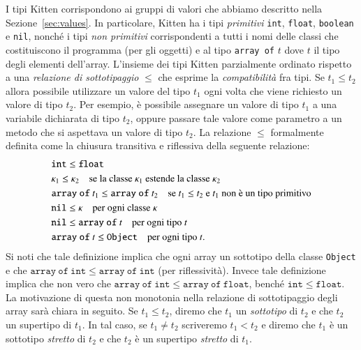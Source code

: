 I tipi Kitten corrispondono ai gruppi di valori che abbiamo descritto
nella Sezione~\ref{sec:values}. In particolare, Kitten ha i tipi
\emph{primitivi} \texttt{int}, \texttt{float}, \texttt{boolean} e
\texttt{nil}, nonch\'e i tipi \emph{non primitivi} corrispondenti
a tutti i nomi delle classi che costituiscono il
programma (per gli oggetti) e al tipo
\texttt{array of} $t$ dove $t$ \e il tipo degli elementi dell'array.
L'insieme dei tipi Kitten \e parzialmente ordinato rispetto a una
\emph{relazione di sottotipaggio} $\le$ che esprime la \emph{compatibilit\`a}
fra tipi. Se $t_1\le t_2$ allora \e possibile utilizzare un valore del
tipo $t_1$ ogni volta che viene richiesto un valore di tipo $t_2$.
Per esempio, \`e possibile assegnare un valore di tipo $t_1$ a una
variabile dichiarata di tipo $t_2$, oppure passare tale valore come parametro
a un metodo che si aspettava un valore di tipo $t_2$.
La relazione $\le$ \e formalmente definita come
la chiusura transitiva e riflessiva della seguente relazione:
%
\begin{eqnarray*}
  &\mathtt{int}\le\mathtt{float}\\
  &\kappa_1\le\kappa_2\quad\text{se la classe $\kappa_1$ estende la classe $\kappa_2$}\\
  &\mathtt{array\ of\ }t_1\le\mathtt{array\ of\ }t_2\quad
    \text{se $t_1\le t_2$ e $t_1$ non \`e un tipo primitivo}\\
  &\mathtt{nil}\le\kappa\quad\text{per ogni classe $\kappa$}\\
  &\mathtt{nil}\le\mathtt{array\ of\ }t\quad\text{per ogni tipo $t$}\\
  &\mathtt{array\ of\ }t\le\mathtt{Object}\quad\text{per ogni tipo $t$.}
\end{eqnarray*}
%
Si noti che tale definizione implica che ogni array \e un sottotipo
della classe \texttt{Object} e che
$\mathtt{array\ of\ int}\le\mathtt{array\ of\ int}$ (per riflessivit\`a).
Invece tale definizione implica che non \e vero che
$\mathtt{array\ of\ int}\le\mathtt{array\ of\ float}$, bench\'e
$\mathtt{int}\le\mathtt{float}$. La motivazione di questa non monotonia
nella relazione di sottotipaggio degli array sar\`a chiara in seguito.
Se $t_1\le t_2$, diremo che $t_1$ \e un \emph{sottotipo} di $t_2$ e che
$t_2$ \e un supertipo di $t_1$. In tal caso, se $t_1\not=t_2$ scriveremo
$t_1<t_2$ e diremo che $t_1$ \`e un sottotipo \emph{stretto}
di $t_2$ e che $t_2$ \`e un supertipo \emph{stretto} di $t_1$.

